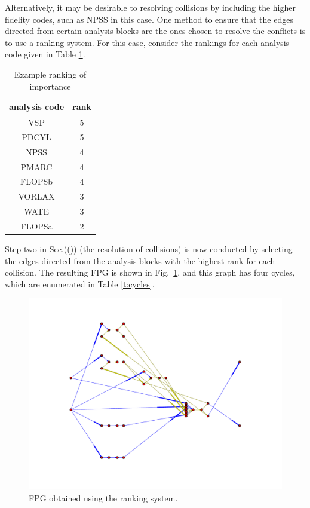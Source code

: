 Alternatively, it may be desirable to resolving collisions by including the higher fidelity codes, such as NPSS in this case.
One method to ensure that the edges directed from certain analysis blocks are the ones chosen to resolve the conflicts is to use a ranking system. For this case, consider the rankings for each analysis code given in Table \ref{t:rankings}.
\begin{table}[htbp]
  \centering
  \caption{Example ranking of importance}
    \begin{tabular}{cc}
    \toprule
    analysis code & rank \\
    \midrule
    VSP   & 5 \\
    PDCYL & 5 \\
    NPSS  & 4 \\
    PMARC & 4 \\
    FLOPSb & 4 \\
    VORLAX & 3 \\
    WATE  & 3 \\
    FLOPSa & 2 \\
    \bottomrule
    \end{tabular}%
  \label{t:rankings}%
\end{table}%
Step two in Sec.(()) (the resolution of collisions) is now conducted by selecting the edges directed from the analysis blocks with the highest rank for each collision. The resulting FPG is shown in Fig.~\ref{f:FPG highest rank}, and this graph has four cycles, which are enumerated in Table \ref{t:cycles}.
\begin{figure}[htb!]
  \begin{center}
    \includegraphics[width=.6\textwidth]{images/FPG_highest_rank}
  \end{center}
  \caption{FPG obtained using the ranking system.}
\label{f:FPG highest rank}
\end{figure}
